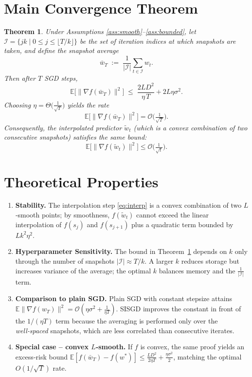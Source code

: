 \documentclass{article}
\newtheorem{theorem}{Theorem}
\newcommand{\E}{\mathbb{E}}
\begin{document}
\section*{Main Convergence Theorem}
\begin{theorem}
\label{thm:main}
Under Assumptions \ref{ass:smooth}–\ref{ass:bounded}, let $\mathcal{I}=\{jk\mid 0\le j\le \lfloor T/k\rfloor\}$ be the set of iteration indices at which snapshots are taken, and define the \emph{snapshot average}
\[
\bar w_T \;:=\; \frac{1}{|\mathcal{I}|}\sum_{t\in\mathcal{I}} w_t .
\]
Then after $T$ SGD steps,
\[
\E\big[\|\nabla f(\bar w_T)\|^2\big]\;\le\;
\frac{2L D^2}{\eta\,T}+2L\eta\sigma^2 .
\]
Choosing $\eta = \Theta\!\big(\frac{1}{\sqrt{T}}\big)$ yields the rate
\[
\E\big[\|\nabla f(\bar w_T)\|^2\big]=\mathcal{O}\!\big(\tfrac{1}{\sqrt{T}}\big).
\]
Consequently, the interpolated predictor $\tilde w_t$ (which is a convex combination of two consecutive snapshots) satisfies the same bound:
\[
\E\big[\|\nabla f(\tilde w_t)\|^2\big]\le \mathcal{O}\!\big(\tfrac{1}{\sqrt{t}}\big).
\]
\end{theorem}

\section*{Theoretical Properties}
\begin{enumerate}
\item \textbf{Stability.} The interpolation step \eqref{eq:interp} is a convex combination of two $L$‑smooth points; by smoothness, $f(\tilde w_t)$ cannot exceed the linear interpolation of $f(s_j)$ and $f(s_{j+1})$ plus a quadratic term bounded by $Lk^2\eta^2$.
\item \textbf{Hyperparameter Sensitivity.} The bound in Theorem~\ref{thm:main} depends on $k$ only through the number of snapshots $|\mathcal{I}|\approx T/k$. A larger $k$ reduces storage but increases variance of the average; the optimal $k$ balances memory and the $\frac{1}{|\mathcal{I}|}$ term.
\item \textbf{Comparison to plain SGD.} Plain SGD with constant stepsize attains $\E\|\nabla f(w_T)\|^2 =\mathcal{O}(\eta\sigma^2+ \frac{1}{\eta T})$. SISGD improves the constant in front of the $1/(\eta T)$ term because the averaging is performed only over the \emph{well‑spaced} snapshots, which are less correlated than consecutive iterates.
\item \textbf{Special case – convex $L$‑smooth.} If $f$ is convex, the same proof yields an excess‑risk bound $\E[f(\bar w_T)-f(w^*)]\le \frac{L D^2}{2\eta T}+ \frac{\eta\sigma^2}{2}$, matching the optimal $O(1/\sqrt{T})$ rate.
\end{enumerate}
\end{document}
